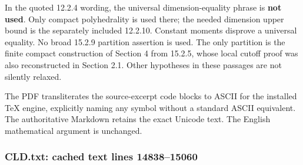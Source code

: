 \documentclass[
  11pt,
]{article}
\begin{document}
In the quoted 12.2.4 wording, the universal dimension-equality phrase is
\textbf{not used}. Only compact polyhedrality is used there; the needed
dimension upper bound is the separately included 12.2.10. Constant
moments disprove a universal equality. No broad 15.2.9 partition
assertion is used. The only partition is the finite compact construction
of Section 4 from 15.2.5, whose local cutoff proof was also
reconstructed in Section 2.1. Other hypotheses in these passages are not
silently relaxed.

The PDF transliterates the source-excerpt code blocks to ASCII for the
installed TeX engine, explicitly naming any symbol without a standard
ASCII equivalent. The authoritative Markdown retains the exact Unicode
text. The English mathematical argument is unchanged.

\subsubsection{CLD.txt: cached text lines
14838--15060}\label{cld.txt-cached-text-lines-1483815060}
\end{document}
